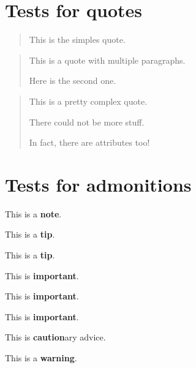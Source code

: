 \documentclass{Metanorma}
\begin{document}
  \section{Tests for quotes}

  \begin{quote}
    This is the simples quote.
  \end{quote}

  \begin{quote}
    This is a quote with multiple paragraphs.

    Here is the second one.
  \end{quote}

  \begin{quote}
    This is a pretty complex quote.

    There could not be more stuff.

    In fact, there are attributes too!
  \end{quote}

  \section{Tests for admonitions}

  \begin{note}
    This is a \textbf{note}.
  \end{note}

  \begin{tip}
    This is a \textbf{tip}.

    This is a \textbf{tip}.
  \end{tip}

  \begin{important}
    This is \textbf{important}.

    This is \textbf{important}.

    This is \textbf{important}.
  \end{important}

  \begin{caution}
    This is \textbf{caution}ary advice.
  \end{caution}

  \begin{warning}
    This is a \textbf{warning}.
  \end{warning}

\end{document}
